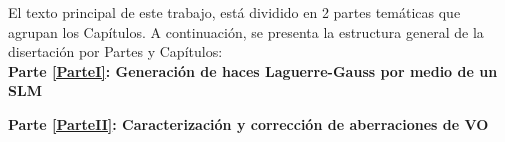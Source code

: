 El texto principal de este trabajo, está dividido en 2 partes temáticas que agrupan los Capítulos. A continuación, se presenta la estructura general de la disertación por Partes y Capítulos: \\


\textbf{Parte \ref{ParteI}: Generación de haces Laguerre-Gauss por medio de un SLM}



\textbf{Parte \ref{ParteII}: Caracterización y corrección de aberraciones de VO}



\newpage
\pagebreak[4]






